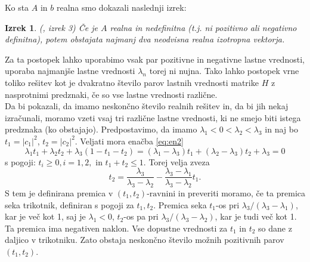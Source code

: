 \documentclass[12pt,a4paper]{amsart}
\theoremstyle{definition}
\theoremstyle{plain}
\newtheorem{izrek}[definicija]{Izrek}
\newcommand{\abs}[1]{ \left\lvert#1\right\rvert}
\begin{document}
Ko sta $A$ in $b$ realna smo dokazali naslednji izrek:
\begin{izrek}(\cite{meurant}, izrek 3)
Če je $A$ realna in nedefinitna (t.j. ni pozitivno ali negativno definitna), potem obstajata najmanj dva neodvisna realna izotropna vektorja. 
\end{izrek}
Za ta postopek lahko uporabimo vsak par pozitivne in negativne lastne vrednosti, uporaba najmanjše lastne vrednosti $\lambda_n$ torej ni nujna. Tako lahko postopek vrne toliko rešitev kot je dvakratno število parov lastnih vrednosti matrike $H$ z nasprotnimi predznaki, če so vse lastne vrednosti različne.\\
Da bi pokazali, da imamo neskončno število realnih rešitev in, da bi jih nekaj izračunali, moramo vzeti vsaj tri različne lastne vrednosti, ki ne smejo biti istega predznaka (ko obstajajo). Predpostavimo, da imamo $\lambda_1 <0<\lambda_2<\lambda_3$ in naj bo $t_1=\abs{c_1}^2$, $t_2=\abs{c_2}^2$. Veljati mora enačba \eqref{eq:en2}
\begin{equation}\label{trije}
\lambda_1 t_1 +\lambda_2 t_2 +\lambda_3 (1- t_1 -t_2)=(\lambda_1 -\lambda_3)t_1 +(\lambda_2 -\lambda_3)t_2 +\lambda_3=0
\end{equation}
s pogoji: $t_i \ge 0, i=1,2,$ in $t_1 +t_2\le1$. Torej velja zveza $$t_2=\frac{\lambda_3}{\lambda_3 - \lambda_2} -\frac{\lambda_3 -\lambda_1}{\lambda_3 -\lambda_2}t_1.$$
S tem je definirana premica v $(t_1,t_2)\text{-ravnini}$ in preveriti moramo, če ta premica seka trikotnik, definiran s pogoji za $t_1,t_2$. Premica seka $t_1$-os pri $\lambda_3 /(\lambda_3 -\lambda_1)$, kar je več kot 1, saj je $\lambda_1 <0$, $t_2$-os pa pri $\lambda_3 /(\lambda_3 - \lambda_2)$, kar je tudi več kot 1. Ta premica ima negativen naklon. Vse dopustne vrednosti za $t_1$ in $t_2$ so dane z daljico v trikotniku. Zato obstaja neskončno število možnih pozitivnih parov $(t_1,t_2)$.
\end{document}
